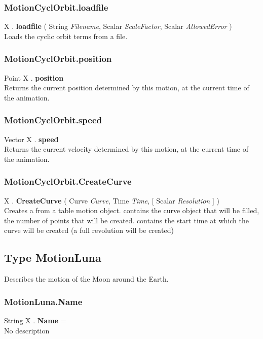 \subsubsection{MotionCyclOrbit.loadfile \label{F:MotionCyclOrbit:loadfile}}
X . \textbf{loadfile} ( String \textit{Filename}, Scalar \textit{ScaleFactor}, Scalar \textit{AllowedError} ) \\
Loads the cyclic orbit terms from a file.

\subsubsection{MotionCyclOrbit.position \label{F:MotionCyclOrbit:position}}
Point X . \textbf{position} \\
Returns the current position determined by this motion, at the current time of the animation.


\subsubsection{MotionCyclOrbit.speed \label{F:MotionCyclOrbit:speed}}
Vector X . \textbf{speed} \\
Returns the current velocity determined by this motion, at the current time of the animation.


\subsubsection{MotionCyclOrbit.CreateCurve \label{F:MotionCyclOrbit:CreateCurve}}
X . \textbf{CreateCurve} ( Curve \textit{Curve}, Time \textit{Time},  [ Scalar \textit{Resolution} ] ) \\
Creates a  from a table motion object.  contains the curve object that will be filled,  the number of points that will be created.  contains the start time at which the curve will be created (a full revolution will be created)



\subsection{Type MotionLuna \label{T:MotionLuna}}
Describes the motion of the Moon around the Earth.

\subsubsection{MotionLuna.Name \label{F:MotionLuna:Name}}
String X . \textbf{Name} = \\
No description

